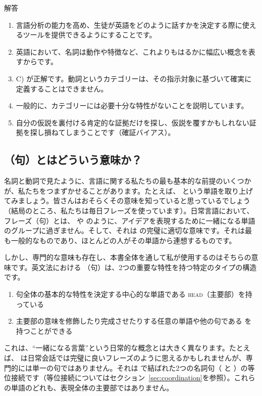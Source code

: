 \begin{tblsfilled}{解答}
\begin{enumerate}[noitemsep, leftmargin=*]
    \item 言語分析の能力を高め、生徒が英語をどのように話すかを決定する際に使えるツールを提供できるようにすることです。
    \item 英語において、名詞は動作や特徴など、これよりもはるかに幅広い概念を表すからです。
    \item C) が正解です。動詞というカテゴリーは、その指示対象に基づいて確実に定義することはできません。
    \item 一般的に、カテゴリーには必要十分な特性がないことを説明しています。
    \item 自分の仮説を裏付ける肯定的な証拠だけを探し、仮説を覆すかもしれない証拠を探し損ねてしまうことです（確証バイアス）。
\end{enumerate}
\end{tblsfilled}

\subsection{（句）とはどういう意味か？}\label{sec:phrases}

名詞と動詞で見たように、言語に関する私たちの最も基本的な前提のいくつかが、私たちをつまずかせることがあります。たとえば、 という単語を取り上げてみましょう。皆さんはおそらくその意味を知っていると思っているでしょう（結局のところ、私たちは毎日フレーズを使っています）。日常言語において、フレーズ（句）とは、 や  のように、アイデアを表現するために一緒になる単語のグループに過ぎません。そして、それは  の完璧に適切な意味です。それは最も一般的なものであり、ほとんどの人がその単語から連想するものです。

しかし、専門的な意味も存在し、本書全体を通して私が使用するのはそちらの意味です。英文法における （句）は、2つの重要な特性を持つ特定のタイプの構造です。
\begin{enumerate}[noitemsep]
    \item 句全体の基本的な特性を決定する中心的な単語である \textsc{head}（主要部）を持っている
    \item 主要部の意味を修飾したり完成させたりする任意の単語や他の句である を持つことができる
\end{enumerate}
これは、\enquote{一緒になる言葉}という日常的な概念とは大きく異なります。たとえば、 は日常会話では完璧に良いフレーズのように思えるかもしれませんが、専門的には単一の句ではありません。それは  で結ばれた2つの名詞句（ と ）の等位接続です（等位接続についてはセクション~\ref{sec:coordination}を参照）。これらの単語のどれも、表現全体の主要部ではありません。

